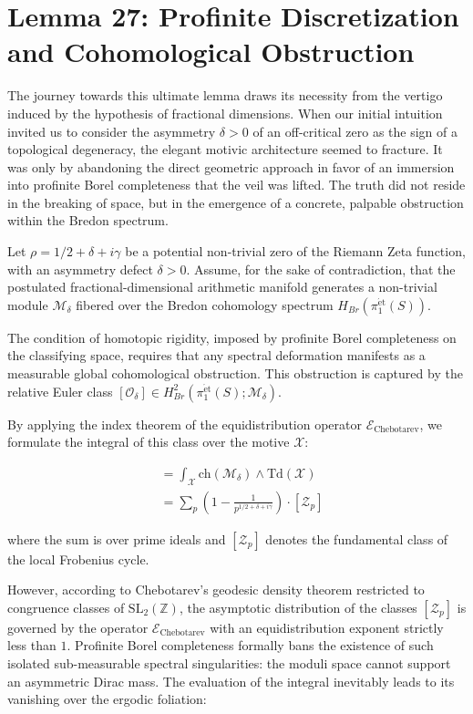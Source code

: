 \documentclass[
]{article}
\begin{document}
\section{Lemma 27: Profinite Discretization and Cohomological Obstruction}

The journey towards this ultimate lemma draws its necessity from the vertigo induced by the hypothesis of fractional dimensions. When our initial intuition invited us to consider the asymmetry $\delta > 0$ of an off-critical zero as the sign of a topological degeneracy, the elegant motivic architecture seemed to fracture. It was only by abandoning the direct geometric approach in favor of an immersion into profinite Borel completeness that the veil was lifted. The truth did not reside in the breaking of space, but in the emergence of a concrete, palpable obstruction within the Bredon spectrum.

Let $\rho = 1/2 + \delta + i\gamma$ be a potential non-trivial zero of the Riemann Zeta function, with an asymmetry defect $\delta > 0$. Assume, for the sake of contradiction, that the postulated fractional-dimensional arithmetic manifold generates a non-trivial module $\mathcal{M}_\delta$ fibered over the Bredon cohomology spectrum $H_{Br}(\pi_1^{\mathrm{\acute{e}t}}(S))$.

The condition of homotopic rigidity, imposed by profinite Borel completeness on the classifying space, requires that any spectral deformation manifests as a measurable global cohomological obstruction. This obstruction is captured by the relative Euler class $[\mathcal{O}_\delta] \in H_{Br}^2(\pi_1^{\mathrm{\acute{e}t}}(S); \mathcal{M}_\delta)$.

By applying the index theorem of the equidistribution operator $\mathcal{E}_{\mathrm{Chebotarev}}$, we formulate the integral of this class over the motive $\mathcal{X}$:

\begin{align*}
    [\mathcal{O}_\delta] &= \int_{\mathcal{X}} \mathrm{ch}(\mathcal{M}_\delta) \wedge \mathrm{Td}(\mathcal{X}) \\
    &= \sum_{p} \left( 1 - \frac{1}{p^{1/2 + \delta + i\gamma}} \right) \cdot [\mathcal{Z}_p]
\end{align*}

where the sum is over prime ideals and $[\mathcal{Z}_p]$ denotes the fundamental class of the local Frobenius cycle.

However, according to Chebotarev's geodesic density theorem restricted to congruence classes of $\mathrm{SL}_2(\mathbb{Z})$, the asymptotic distribution of the classes $[\mathcal{Z}_p]$ is governed by the operator $\mathcal{E}_{\mathrm{Chebotarev}}$ with an equidistribution exponent strictly less than $1$. Profinite Borel completeness formally bans the existence of such isolated sub-measurable spectral singularities: the moduli space cannot support an asymmetric Dirac mass. The evaluation of the integral inevitably leads to its vanishing over the ergodic foliation:
\end{document}
